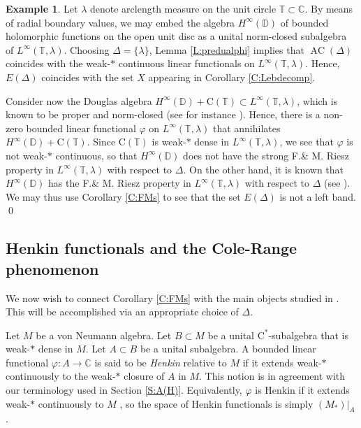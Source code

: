 \documentclass[10pt]{amsart}
\newcommand{\bC}{{\mathbb{C}}}
\newcommand{\bD}{{\mathbb{D}}}
\newcommand{\bT}{{\mathbb{T}}}
\newcommand{\rC}{\mathrm{C}}
\renewcommand{\phi}{\varphi}
\newcommand{\AC}{\operatorname{AC}}
\theoremstyle{definition}
\newtheorem{example}{Example}
\begin{document}
\begin{example}\label{E:Hinfband}
Let $\lambda$ denote arclength measure on the unit circle $\bT\subset \bC$. By means of radial boundary values, we may embed the algebra $H^\infty(\bD)$ of bounded holomorphic functions on the open unit disc as a unital norm-closed subalgebra of $L^\infty(\bT,\lambda)$. Choosing $\Delta=\{\lambda\}$, 
Lemma \ref{L:predualphi} implies that $\AC(\Delta)$ coincides with the weak-$*$ continuous linear functionals on $L^\infty(\bT,\lambda)$. 
Hence, $E(\Delta)$ coincides with the set $X$ appearing in Corollary \ref{C:Lebdecomp}.

Consider now the Douglas algebra $H^\infty(\bD)+\rC(\bT)\subset L^\infty(\bT,\lambda)$, which is known to be proper and norm-closed (see for instance \cite[Chapter 6]{douglas1998}). Hence, there is a non-zero bounded linear functional $\phi$ on $L^\infty(\bT,\lambda)$ that annihilates $H^\infty(\bD)+\rC(\bT)$. Since $\rC(\bT)$ is weak-$*$ dense in $L^\infty(\bT,\lambda)$, we see that $\phi$ is not weak-$*$ continuous, so that $H^\infty(\bD)$ does not have the strong F.\& M. Riesz property in $L^\infty(\bT,\lambda)$ with respect to $\Delta$. On the other hand,  it is known
 that $H^\infty(\bD)$ has  the F.\& M. Riesz property in $L^\infty(\bT,\lambda)$ with respect to $\Delta$ (see \cite{ando1978}). We may thus use Corollary \ref{C:FMs} to see that the  set $E(\Delta)$  is not a left
band. \qed
\end{example}


 

\subsection{Henkin functionals and the Cole-Range phenomenon}
We now wish to connect Corollary \ref{C:FMs} with the main objects studied in \cite{CT2023Henkin}. This will be accomplished via an appropriate choice of $\Delta$. 





Let $M$ be a von Neumann algebra. Let $B\subset M$ be a unital $\rC^*$-subalgebra that is weak-$*$ dense in $M$. Let $A\subset B$ be a unital subalgebra.  A bounded linear functional $\phi:A\to\bC$ is said to be \emph{Henkin} relative to $M$ if it extends weak-$*$ continuously to the weak-$*$ closure of $A$ in $M$. This notion is in agreement with our terminology used in Section \ref{S:A(H)}. 
Equivalently, $\phi$ is Henkin  if it extends weak-$*$ continuously to $M$ \cite[Theorem 3.6]{rudin1991FA}, so the space of Henkin functionals is simply $(M_*)|_A$. 
\end{document}
